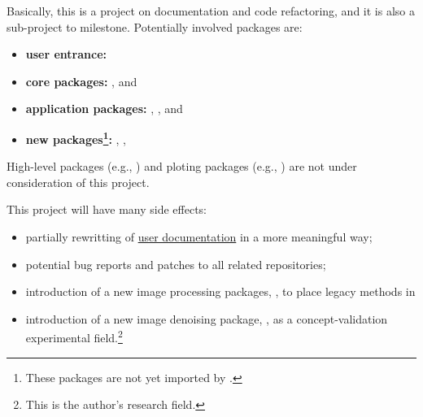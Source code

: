 Basically, this is a project on documentation and code refactoring, and it is also a sub-project to \images{}  milestone. Potentially involved packages are:
\begin{itemize}
    \item \textbf{user entrance:} \repoimages
    \item \textbf{core packages:} \repoimagecore, \repoimageaxes and \repoimagemetadata
    \item \textbf{application packages:} \repoimagemorphology, \repoimagetransformations, \repoimagedistance and \repoimagefiltering
    \item \textbf{new packages\footnote{These packages are not yet imported by \images.}:} \repoimagebinarization, \repohistogramthresholding, \repoimageinpainting
\end{itemize}
High-level packages (e.g., \repoimagetracking) and ploting packages (e.g., \repoimageview) are not under consideration of this project.\par

This project will have many side effects:
\begin{itemize}
    \item partially rewritting of \href{https://juliaimages.org}{user documentation} in a more meaningful way;
    \item potential bug reports and patches to all related \langjulia repositories;
    \item introduction of a new image processing packages, , to place legacy methods in \images
    \item introduction of a new image denoising package, \repoimagenoise, as a concept-validation experimental field.\footnote{This is the author's research field.}
\end{itemize}
